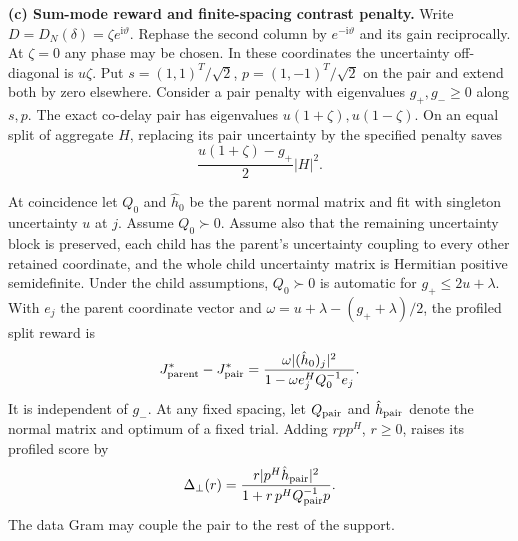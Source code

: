 \begin{afdmprop}
\medskip\noindent
\textup{\textbf{(c) Sum-mode reward and finite-spacing contrast penalty.}}
Write $D=D_N(\delta)=\zeta e^{\mathrm{i}\vartheta}$. Rephase the
second column by $e^{-\mathrm{i}\vartheta}$ and its gain reciprocally.
At $\zeta=0$ any phase may be chosen. In these coordinates the
uncertainty off-diagonal is $u\zeta$. Put
$s=(1,1)^T/\sqrt2$, $p=(1,-1)^T/\sqrt2$ on the pair and extend
both by zero elsewhere. Consider a pair penalty with eigenvalues
$g_+,g_-\ge0$ along $s,p$. The exact co-delay pair has eigenvalues
$u(1+\zeta),u(1-\zeta)$. On an equal split of aggregate $H$,
replacing its pair uncertainty by the specified penalty saves
\begin{equation}
 \frac{u(1+\zeta)-g_+}{2}|H|^2 .                          \label{eq:af-fixed-H}
\end{equation}

At coincidence let $Q_0$ and $\hat h_0$ be the parent normal matrix
and fit with singleton uncertainty $u$ at $j$. Assume $Q_0\succ0$.
Assume also that the remaining uncertainty block is preserved, each
child has the parent's uncertainty coupling to every other retained
coordinate, and the whole child uncertainty matrix is Hermitian
positive semidefinite. Under the child assumptions, $Q_0\succ0$ is
automatic for $g_+\le2u+\lambda$. With $e_j$ the parent coordinate
vector and $\omega=u+\lambda-(g_++\lambda)/2$, the profiled split
reward is
\begin{equation}
 J_{\rm parent}^*-J_{\rm pair}^*
 =\frac{\omega|(\hat h_0)_j|^2}
        {1-\omega e_j^HQ_0^{-1}e_j}.                      \label{eq:af-profile-split}
\end{equation}
It is independent of $g_-$. At any fixed spacing, let $Q_{\rm pair}$
and $\hat h_{\rm pair}$ denote the normal matrix and optimum of a
fixed trial. Adding $rpp^H$, $r\ge0$, raises its profiled score by
\begin{equation}
 \Delta_\perp(r)=
 \frac{r|p^H\hat h_{\rm pair}|^2}
      {1+r\,p^HQ_{\rm pair}^{-1}p}.                        \label{eq:af-dose}
\end{equation}
The data Gram may couple the pair to the rest of the support.


\end{afdmprop}
